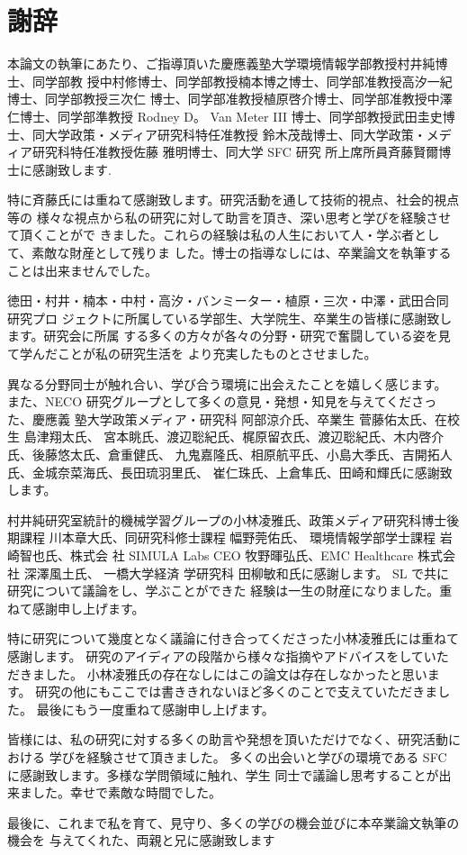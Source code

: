 \chapter*{謝辞}
\label{thanks}

本論文の執筆にあたり、ご指導頂いた慶應義塾大学環境情報学部教授村井純博士、同学部教
授中村修博士、同学部教授楠本博之博士、同学部准教授高汐一紀博士、同学部教授三次仁
博士、同学部准教授植原啓介博士、同学部准教授中澤仁博士、同学部準教授 Rodney D。
Van Meter III 博士、同学部教授武田圭史博士、同大学政策・メディア研究科特任准教授
鈴木茂哉博士、同大学政策・メディア研究科特任准教授佐藤 雅明博士、同大学 SFC 研究
所上席所員斉藤賢爾博士に感謝致します.

特に斉藤氏には重ねて感謝致します。研究活動を通して技術的視点、社会的視点等の
様々な視点から私の研究に対して助言を頂き、深い思考と学びを経験させて頂くことがで
きました。これらの経験は私の人生において人・学ぶ者として、素敵な財産として残りま
した。博士の指導なしには、卒業論文を執筆することは出来ませんでした。

徳田・村井・楠本・中村・高汐・バンミーター・植原・三次・中澤・武田合同研究プロ
ジェクトに所属している学部生、大学院生、卒業生の皆様に感謝致します。研究会に所属
する多くの方々が各々の分野・研究で奮闘している姿を見て学んだことが私の研究生活を
より充実したものとさせました。

異なる分野同士が触れ合い、学び合う環境に出会えたことを嬉しく感じます。
また、NECO 研究グループとして多くの意見・発想・知見を与えてくださった、慶應義
塾大学政策メディア・研究科 阿部涼介氏、卒業生 菅藤佑太氏、在校生 島津翔太氏、
宮本眺氏、渡辺聡紀氏、梶原留衣氏、渡辺聡紀氏、木内啓介氏、後藤悠太氏、倉重健氏、
九鬼嘉隆氏、相原航平氏、小島大季氏、吉開拓人氏、金城奈菜海氏、長田琉羽里氏、
崔仁珠氏、上倉隼氏、田崎和輝氏に感謝致します。

村井純研究室統計的機械学習グループの小林凌雅氏、政策メディア研究科博士後期課程 川本章大氏、同研究科修士課程 幅野莞佑氏、
環境情報学部学士課程 岩崎智也氏、株式会 社 SIMULA Labs CEO 牧野暉弘氏、EMC Healthcare 株式会 社 深澤風土氏、
一橋大学経済 学研究科 田柳敏和氏に感謝します。
SL で共に研究について議論をし、学ぶことができた 経験は一生の財産になりました。重ねて感謝申し上げます。

特に研究について幾度となく議論に付き合ってくださった小林凌雅氏には重ねて感謝します。
研究のアイディアの段階から様々な指摘やアドバイスをしていただきました。
小林凌雅氏の存在なしにはこの論文は存在しなかったと思います。
研究の他にもここでは書ききれないほど多くのことで支えていただきました。
最後にもう一度重ねて感謝申し上げます。

皆様には、私の研究に対する多くの助言や発想を頂いただけでなく、研究活動における
学びを経験させて頂きました。
多くの出会いと学びの環境である SFC に感謝致します。多様な学問領域に触れ、学生
同士で議論し思考することが出来ました。幸せで素敵な時間でした。

最後に、これまで私を育て、見守り、多くの学びの機会並びに本卒業論文執筆の機会を
与えてくれた、両親と兄に感謝致します



